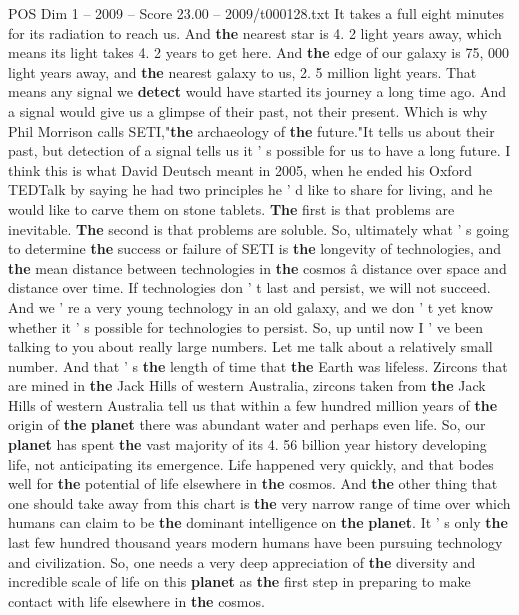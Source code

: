 \begin{textsample}{POS Dim 1 – 2009 – Score 23.00 – 2009/t000128.txt}
It takes a full eight minutes for its radiation to reach us.
And \textbf{the} nearest star is 4. 2 light years away, which means its light takes 4. 2 years to get here.
And \textbf{the} edge of our galaxy is 75, 000 light years away, and \textbf{the} nearest galaxy to us, 2. 5 million light years.
That means any signal we \textbf{detect} would have started its journey a long time ago.
And a signal would give us a glimpse of their past, not their present.
Which is why Phil Morrison calls SETI,"\textbf{the} archaeology of \textbf{the} future."It tells us about their past, but detection of a signal tells us it ' s possible for us to have a long future.
I think this is what David Deutsch meant in 2005, when he ended his Oxford TEDTalk by saying he had two principles he ' d like to share for living, and he would like to carve them on stone tablets. \textbf{The} first is that problems are inevitable. \textbf{The} second is that problems are soluble.
So, ultimately what ' s going to determine \textbf{the} success or failure of SETI is \textbf{the} longevity of technologies, and \textbf{the} mean distance between technologies in \textbf{the} cosmos â distance over space and distance over time.
If technologies don ' t last and persist, we will not succeed.
And we ' re a very young technology in an old galaxy, and we don ' t yet know whether it ' s possible for technologies to persist.
So, up until now I ' ve been talking to you about really large numbers.
Let me talk about a relatively small number.
And that ' s \textbf{the} length of time that \textbf{the} Earth was lifeless.
Zircons that are mined in \textbf{the} Jack Hills of western Australia, zircons taken from \textbf{the} Jack Hills of western Australia tell us that within a few hundred million years of \textbf{the} origin of \textbf{the} \textbf{planet} there was abundant water and perhaps even life.
So, our \textbf{planet} has spent \textbf{the} vast majority of its 4. 56 billion year history developing life, not anticipating its emergence.
Life happened very quickly, and that bodes well for \textbf{the} potential of life elsewhere in \textbf{the} cosmos.
And \textbf{the} other thing that one should take away from this chart is \textbf{the} very narrow range of time over which humans can claim to be \textbf{the} dominant intelligence on \textbf{the} \textbf{planet}.
It ' s only \textbf{the} last few hundred thousand years modern humans have been pursuing technology and civilization.
So, one needs a very deep appreciation of \textbf{the} diversity and incredible scale of life on this \textbf{planet} as \textbf{the} first step in preparing to make contact with life elsewhere in \textbf{the} cosmos.

\end{textsample}
